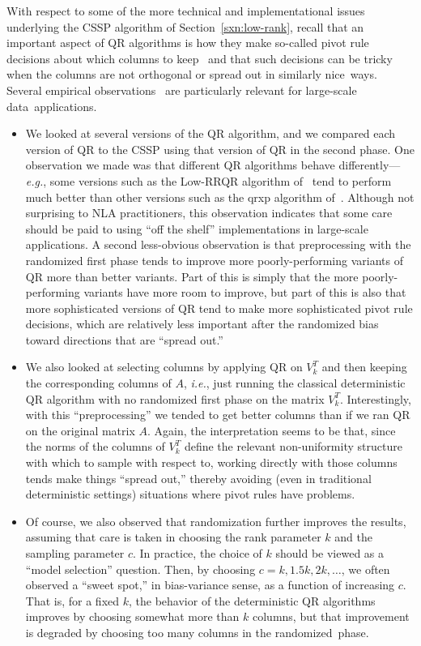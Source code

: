 \documentclass[twoside]{article}
\begin{document}
With respect to some of the more technical and implementational issues
underlying the CSSP algorithm of Section~\ref{sxn:low-rank}, recall that an 
important aspect of QR algorithms is how they make so-called pivot rule 
decisions about which columns to keep~\cite{GVL96} and that such decisions 
can be tricky when the columns are not orthogonal or spread out in similarly 
nice~ways.
Several empirical observations~\cite{BMD08_CSSP_KDD,BMD08_CSSP_TRv2} are 
particularly relevant for large-scale data~applications.
\begin{itemize}
\item
We looked at several versions of the QR algorithm, and we compared each 
version of QR to the CSSP using that version of QR in the second phase.
One observation we made was that different QR algorithms behave 
differently---\emph{e.g.}, some versions such as the Low-RRQR algorithm 
of~\cite{CH94} tend to perform much better than other versions such as the 
qrxp algorithm of~\cite{BQ98a,BQ98b}.
Although not surprising to NLA practitioners, this observation indicates 
that some care should be paid to using ``off the shelf'' implementations in 
large-scale applications.
A second less-obvious observation is that preprocessing with the randomized 
first phase tends to improve more poorly-performing variants of QR more than 
better variants.
Part of this is simply that the more poorly-performing variants have more 
room to improve, but part of this is also that more sophisticated versions 
of QR tend to make more sophisticated pivot rule decisions, which are 
relatively less important after the randomized bias toward directions that 
are ``spread out.''
\item
We also looked at selecting columns by applying QR on $V_k^T$ and then 
keeping the corresponding columns of $A$, \emph{i.e.}, just running the 
classical deterministic QR algorithm with no randomized first phase on the 
matrix $V_k^T$.
Interestingly, with this ``preprocessing'' we tended to get better columns 
than if we ran QR on the original matrix $A$.
Again, the interpretation seems to be that, since the norms of the columns of 
$V_k^T$ define the relevant non-uniformity structure with which to sample 
with respect to, working directly with those columns tends make things 
``spread out,'' thereby avoiding (even in traditional deterministic 
settings) situations where pivot rules have problems.
\item
Of course, we also observed that randomization further improves the results, 
assuming that care is taken in choosing the rank parameter $k$ and the 
sampling parameter $c$.
In practice, the choice of $k$ should be viewed as a ``model selection'' 
question.
Then, by choosing $c=k,1.5k,2k,\ldots$, we often observed a 
``sweet spot,'' in bias-variance sense, as a function of increasing $c$.
That is, for a fixed $k$, the behavior of the deterministic QR algorithms 
improves by choosing somewhat more than $k$ columns, but that improvement 
is degraded by choosing too many columns in the randomized~phase.
\end{itemize}
\end{document}
